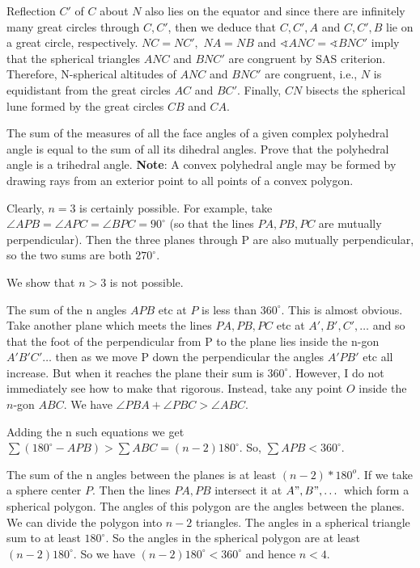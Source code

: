 \documentclass[12pt,a4paper]{memoir}
\theoremstyle{definition}
\begin{document}
\begin{solution}[name={Solution by Luis González}] 
	Reflection $C'$ of $C$ about $N$ also lies on the equator and since there are infinitely many great circles through $C,C'$, then we deduce that $C,C',A$ and $C,C',B$ lie on a great circle, respectively. $NC=NC',$ $NA=NB$ and $\sphericalangle ANC=\sphericalangle BNC'$ imply that the spherical triangles $ANC$ and $BNC'$ are congruent by SAS criterion. Therefore,  N-spherical altitudes of $ANC$ and $BNC'$ are congruent, i.e., $N$ is equidistant from the great circles $AC$ and $BC'$. Finally, $CN$ bisects the spherical lune formed by the great circles $CB$ and $CA$.
\end{solution}




\begin{question}[name={1981 USAMO}]
	The sum of the measures of all the face angles of a given complex polyhedral angle is equal to the sum of all its dihedral angles. Prove that the polyhedral angle is a trihedral angle. \textbf{Note}: A convex polyhedral angle may be formed by drawing rays from an exterior point to all points of a convex polygon.
\end{question}

\begin{solution}[name={Solution from Kalva}] 
	Clearly, $n = 3$ is certainly possible. For example, take $\angle {APB} = \angle {APC} = \angle {BPC} = 90^{\circ}$ (so that the lines $PA, PB, PC$ are mutually perpendicular). Then the three planes through P are also mutually perpendicular, so the two sums are both $270^{\circ}$.
	
	We show that $n > 3$ is not possible.
	
	The sum of the n angles $APB$ etc at $P$ is less than $360^\circ$. This is almost obvious. Take another plane which meets the lines $PA, PB, PC$ etc at $A', B', C', \dots$ and so that the foot of the perpendicular from P to the plane lies inside the n-gon $A'B'C' \dots$ then as we move P down the perpendicular the angles $A'PB'$ etc all increase. But when it reaches the plane their sum is $360^\circ$. However, I do not immediately see how to make that rigorous. Instead, take any point $O$ inside the $n$-gon $ABC$. We have $\angle PBA + \angle PBC > \angle ABC$.
	
	Adding the n such equations we get $\sum(180^\circ - APB) > \sum ABC = (n - 2) 180^\circ$. So, $\sum APB < 360^\circ$.
	
	The sum of the n angles between the planes is at least $(n - 2)*180^o$. If we take a sphere center $P$. Then the lines $PA, PB$ intersect it at $A", B", \dots$ which form a spherical polygon. The angles of this polygon are the angles between the planes. We can divide the polygon into $n - 2$ triangles. The angles in a spherical triangle sum to at least $180^\circ$. So the angles in the spherical polygon are at least $(n - 2) 180^\circ$. So we have $(n - 2) 180^\circ < 360^\circ$ and hence $n < 4$.
\end{solution}
\end{document}
